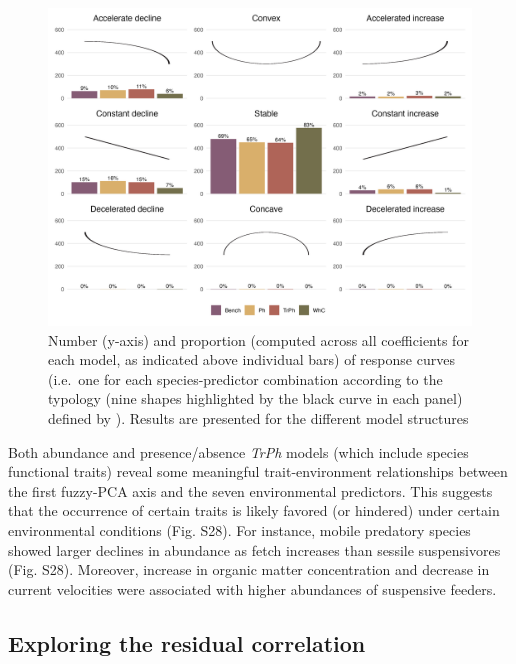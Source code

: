 \begin{refsection}
\begin{figure}
\hypertarget{fig:chapt1fig5}{%
\centering
\includegraphics{03-Chapitre1/figures/fig5.png}
\caption[Number and proportion of response curves shapes.]{Number (y-axis) and proportion (computed across all
coefficients for each model, as indicated above individual bars) of
response curves (i.e.~one for each species-predictor combination
according to the typology (nine shapes highlighted by the black curve in
each panel) defined by \textcite{Rigal_2020}). Results are presented for
the different model structures}\label{fig:chapt1fig5}
}
\end{figure}

Both abundance and presence/absence \emph{TrPh} models (which include
species functional traits) reveal some meaningful trait-environment
relationships between the first fuzzy-PCA axis and the seven
environmental predictors. This suggests that the occurrence of certain
traits is likely favored (or hindered) under certain environmental
conditions (Fig. S28). For instance, mobile predatory species showed
larger declines in abundance as fetch increases than sessile
suspensivores (Fig. S28). Moreover, increase in organic matter
concentration and decrease in current velocities were associated with
higher abundances of suspensive feeders.

\hypertarget{exploring-the-residual-correlation}{%
\subsection{Exploring the residual
correlation}\label{exploring-the-residual-correlation}}


\end{refsection}
